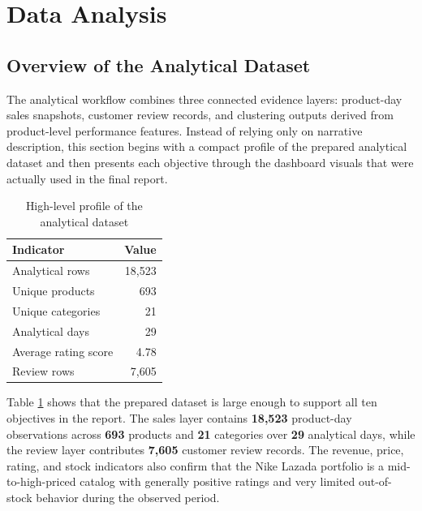 \section{Data Analysis}

\subsection{Overview of the Analytical Dataset}

The analytical workflow combines three connected evidence layers: product-day sales snapshots, customer review records, and clustering outputs derived from product-level performance features. Instead of relying only on narrative description, this section begins with a compact profile of the prepared analytical dataset and then presents each objective through the dashboard visuals that were actually used in the final report.

\begin{table}[H]
\centering
\renewcommand{\arraystretch}{1.3}
\begin{tabular}{|l|r|}
\hline
\textbf{Indicator} & \textbf{Value} \\ \hline
Analytical rows & 18,523 \\ \hline
Unique products & 693 \\ \hline
Unique categories & 21 \\ \hline
Analytical days & 29 \\ \hline
Average rating score & 4.78 \\ \hline
Review rows & 7,605 \\ \hline
\end{tabular}
\caption{High-level profile of the analytical dataset}
\label{tab:dataset-profile}
\end{table}

Table \ref{tab:dataset-profile} shows that the prepared dataset is large enough to support all ten objectives in the report. The sales layer contains \textbf{18,523} product-day observations across \textbf{693} products and \textbf{21} categories over \textbf{29} analytical days, while the review layer contributes \textbf{7,605} customer review records. The revenue, price, rating, and stock indicators also confirm that the Nike Lazada portfolio is a mid-to-high-priced catalog with generally positive ratings and very limited out-of-stock behavior during the observed period.

